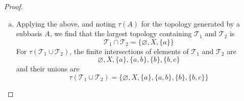 \documentclass[11pt,a4paper,twoside]{article}
\theoremstyle{definition}
\begin{document}
\begin{proof}
\begin{enumerate}[(a)]
  \item Applying the above, and noting $\tau ( A )$ for the topology generated by a subbasis $A$,
    we find that the largest topology containing $\mathscr{T}_1$ and $\mathscr{T}_2$ is
    \begin{equation*}
      \mathscr{T}_1 \cap \mathscr{T}_2 = \big\{ \varnothing, X, \{ a \} \big\}
    \end{equation*}
    For $\tau ( \mathscr{T}_1 \cup \mathscr{T}_2 )$, the finite intersections of elements of $\mathscr{T}_1$
    and $\mathscr{T}_2$ are
    \begin{equation*}
      \varnothing, X, \{ a \}, \{ a, b \}, \{ b \}, \{ b, c \}
    \end{equation*}
    and their unions are
    \begin{equation*}
      \tau ( \mathscr{T}_1 \cup \mathscr{T}_2 ) = \big\{ \varnothing, X, \{ a \}, \{ a, b \}, \{ b \}, \{ b, c \} \big\}
    \end{equation*}

\end{enumerate}

\end{proof}
\end{document}
